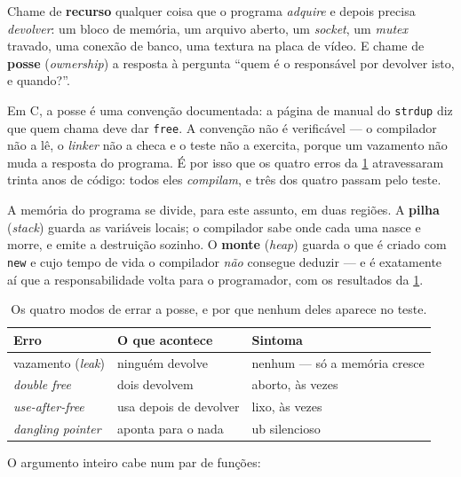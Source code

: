 Chame de \textbf{recurso} qualquer coisa que o programa \emph{adquire} e depois
precisa \emph{devolver}: um bloco de memória, um arquivo aberto, um
\emph{socket}, um \emph{mutex} travado, uma conexão de banco, uma textura na
placa de vídeo. E chame de \textbf{posse} (\emph{ownership}) a resposta à
pergunta ``quem é o responsável por devolver isto, e quando?''.

\begin{porque}
Em C, a posse é uma convenção documentada: a página de manual do
\texttt{strdup} diz que quem chama deve dar \texttt{free}. A convenção não é
verificável --- o compilador não a lê, o \emph{linker} não a checa e o teste
não a exercita, porque um vazamento não muda a resposta do programa. É por isso
que os quatro erros da \cref{tab:erros-posse} atravessaram trinta anos de
código: todos eles \emph{compilam}, e três dos quatro passam pelo teste.
\end{porque}

A memória do programa se divide, para este assunto, em duas regiões. A
\textbf{pilha} (\emph{stack}) guarda as variáveis locais; o compilador sabe
onde cada uma nasce e morre, e emite a destruição sozinho. O \textbf{monte}
(\emph{heap}) guarda o que é criado com \texttt{new} e cujo tempo de vida o
compilador \emph{não} consegue deduzir --- e é exatamente aí que a
responsabilidade volta para o programador, com os resultados da
\cref{tab:erros-posse}.

\begin{table}[htbp]
\centering
\caption{Os quatro modos de errar a posse, e por que nenhum deles aparece no
         teste.}
\label{tab:erros-posse}
\footnotesize
\begin{tabular}{@{}lll@{}}
\toprule
\textbf{Erro} & \textbf{O que acontece} & \textbf{Sintoma} \\
\midrule
vazamento (\emph{leak})     & ninguém devolve     & nenhum --- só a memória cresce \\
\emph{double free}          & dois devolvem       & aborto, às vezes \\
\emph{use-after-free}       & usa depois de devolver & lixo, às vezes \\
\emph{dangling pointer}     & aponta para o nada  & \gls{ub} silencioso \\
\bottomrule
\end{tabular}
\end{table}

O argumento inteiro cabe num par de funções:

